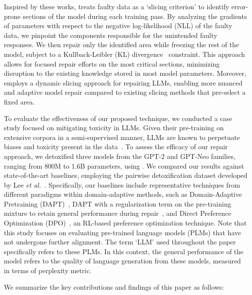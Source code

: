 Inspired by these works, \nick treats faulty data as a `slicing criterion' to identify error-prone sections of the model during each training pass. By analyzing the gradients of parameters with respect to the negative log-likelihood (NLL) of the faulty data, we pinpoint the components responsible for the unintended faulty responses. We then repair only the identified area while freezing the rest of the model, subject to a Kullback-Leibler (KL) divergence~\cite{csiszar1975divergence} constraint. This approach allows for focused repair efforts on the most critical sections, minimizing disruption to the existing knowledge stored in most model parameters. Moreover, \nick employs a dynamic slicing approach for repairing LLMs, enabling more nuanced and adaptive model repair compared to existing slicing methods that pre-select a fixed area.

To evaluate the effectiveness of our proposed technique, we conducted a case study focused on mitigating toxicity in LLMs. Given their pre-training on extensive corpora in a semi-supervised manner, LLMs are known to perpetuate biases and toxicity present in the data~\cite{xu2022leashing}. To assess the efficacy of our repair approach, we detoxified three models from the GPT-2 and GPT-Neo families, ranging from 800M to 1.6B parameters, using \nick. We compared our results against state-of-the-art baselines, employing the pairwise detoxification dataset developed by Lee \textit{et al.}~\cite{lee2024mechanistic}. Specifically, our baselines include representative techniques from different paradigms within domain-adaptive methods, such as Domain-Adaptive Pretraining (DAPT)~\cite{gururangan2020don,gehman2020realtoxicityprompts}, DAPT with a regularization term on the pre-training mixture to retain general performance during repair~\cite{liu2023chain}, and Direct Preference Optimization (DPO)~\cite{rafailov2024direct}, an RL-based preference optimization technique. Note that this study focuses on evaluating pre-trained language models (PLMs) that have not undergone further alignment. The term `LLM' used throughout the paper specifically refers to these PLMs. In this context, the general performance of the model refers to the quality of language generation from these models, measured in terms of perplexity metric.


We summarize the key contributions and findings of this paper as follows:

